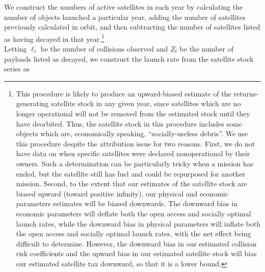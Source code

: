 \documentclass[12pt]{article}
\begin{document}
We construct the numbers of active satellites in each year by calculating the number of objects launched a particular year, adding the number of satellites previously calculated in orbit, and then subtracting the number of satellites listed as having decayed in that year.\footnote{This procedure is likely to produce an upward-biased estimate of the returns-generating satellite stock in any given year, since satellites which are no longer operational will not be removed from the estimated stock until they have deorbited. Thus, the satellite stock in this procedure includes some objects which are, economically speaking, ``socially-useless debris''. We use this procedure despite the attribution issue for two reasons. First, we do not have data on when specific satellites were declared nonoperational by their owners. Such a determination can be particularly tricky when a mission has ended, but the satellite still has fuel and could be repurposed for another mission. Second, to the extent that our estimates of the satellite stock are biased upward (toward positive infinity), our physical and economic parameters estimates will be biased downwards. The downward bias in economic parameters will deflate both the open access and socially optimal launch rates, while the downward bias in physical parameters will inflate both the open access and socially optimal launch rates, with the net effect being difficult to determine. However, the downward bias in our estimated collision risk coefficients and the upward bias in our estimated satellite stock will bias our estimated satellite tax downward, so that it is a lower bound.} \\


Letting $\ell_t$ be the number of collisions observed and $Z_t$ be the number of payloads listed as decayed, we construct the launch rate from the satellite stock series as
\end{document}
